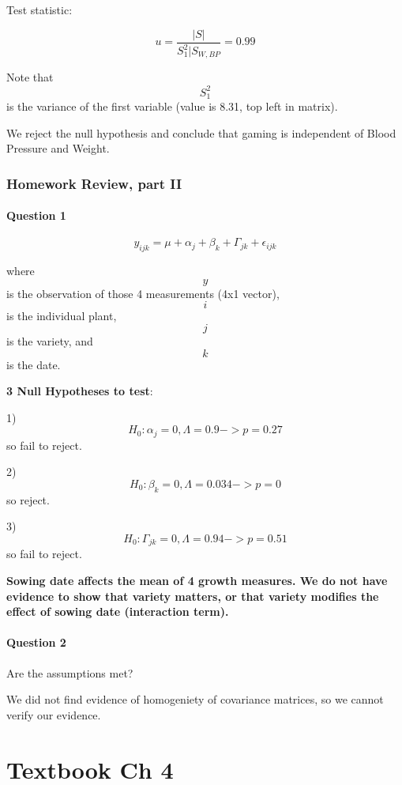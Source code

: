 \documentclass[]{article}
\let\oldparagraph\paragraph
\renewcommand{\paragraph}[1]{\oldparagraph{#1}\mbox{}}
\begin{document}
Test statistic:

\[u = \frac{|S|}{S_1^2 |S_{W, BP}} = 0.99\]

Note that \[S_1^2\] is the variance of the first variable (value is
8.31, top left in matrix).

We reject the null hypothesis and conclude that gaming is independent of
Blood Pressure and Weight.

\hypertarget{homework-review-part-ii}{%
\subsubsection{Homework Review, part II}\label{homework-review-part-ii}}

\hypertarget{question-1}{%
\paragraph{Question 1}\label{question-1}}

\[y_{ijk} = \mu + \alpha_j + \beta_k + \Gamma_{jk} + \epsilon_{ijk}\]

where \[y\] is the observation of those 4 measurements (4x1 vector),
\[i\] is the individual plant, \[j\] is the variety, and \[k\] is the
date.

\textbf{3 Null Hypotheses to test}:

1) \[H_0: \alpha_j = 0, \Lambda = 0.9 -> p = 0.27\] so fail to reject.

2) \[H_0: \beta_k = 0, \Lambda = 0.034 -> p = 0\] so reject.

3) \[H_0: \Gamma_{jk} = 0, \Lambda = 0.94 -> p = 0.51\] so fail to
reject.

\textbf{Sowing date affects the mean of 4 growth measures. We do not
have evidence to show that variety matters, or that variety modifies the
effect of sowing date (interaction term).}

\hypertarget{question-2}{%
\paragraph{Question 2}\label{question-2}}

Are the assumptions met?

We did not find evidence of homogeniety of covariance matrices, so we
cannot verify our evidence.

\hypertarget{textbook-ch-4}{%
\section{Textbook Ch 4}\label{textbook-ch-4}}
\end{document}
